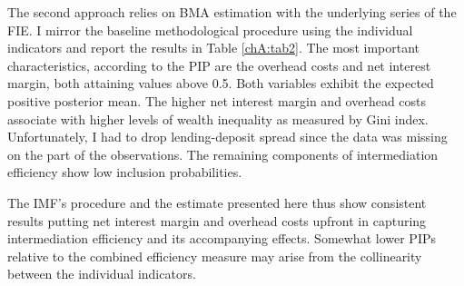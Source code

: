 \begin{enumerate}[resume]
    The second approach relies on \ac{BMA} estimation with the underlying series of the FIE. I mirror the baseline methodological procedure using the individual indicators and report the results in Table \ref{chA:tab2}. The most important characteristics, according to the \ac{PIP} are the overhead costs and net interest margin, both attaining values above 0.5. Both variables exhibit the expected positive posterior mean. The higher net interest margin and overhead costs associate with higher levels of wealth inequality as measured by Gini index. Unfortunately, I had to drop lending-deposit spread since the data was missing on the part of the observations. The remaining components of intermediation efficiency show low inclusion probabilities.

    The IMF's procedure and the estimate presented here thus show consistent results putting net interest margin and overhead costs upfront in capturing intermediation efficiency and its accompanying effects. Somewhat lower \acp{PIP} relative to the combined efficiency measure may arise from the collinearity between the individual indicators.
    

\end{enumerate}
